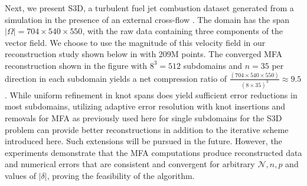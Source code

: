 Next, we present S3D, a turbulent fuel jet combustion dataset generated from a simulation in the presence of an external cross-flow \cite{chen2009}. The  domain has the span $\left| \Omega \right|=704 \times 540 \times 550$, with the raw data containing three components of the vector field. We choose to use the magnitude of this velocity field in our reconstruction study shown below in  with 209M points. The converged MFA reconstruction shown in the figure with $8^3=512$ subdomains and $n=35$ per direction  in each subdomain yields a net compression ratio of $\frac{(704\times540\times550)}{(8\times35)^3} \approx 9.5$. While uniform refinement in knot spans does yield sufficient error reductions in most subdomains, utilizing adaptive error resolution with knot insertions and removals for MFA as previously used here for single subdomains \cite{nashed-rational} for the S3D problem can provide better reconstructions in addition to the iterative scheme introduced here. Such extensions will be pursued in the future. However, the experiments demonstrate that the MFA computations produce reconstructed data and  numerical errors that are consistent and convergent for arbitrary $\mathcal{N}, n, p$ and values of $\left| \delta \right|$, proving the feasibility of the algorithm.

